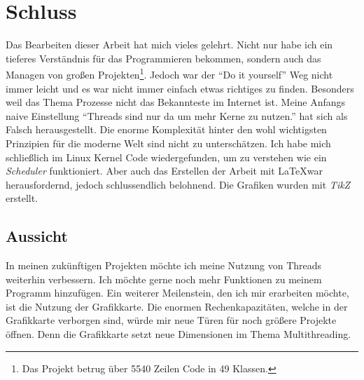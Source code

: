 \section{Schluss}
Das Bearbeiten dieser Arbeit hat mich vieles gelehrt. Nicht nur habe ich ein tieferes Verständnis für das Programmieren bekommen, sondern auch das Managen von großen Projekten\footnote{Das Projekt betrug über 5540 Zeilen Code in 49 Klassen.}. Jedoch war der ``Do it yourself'' Weg nicht immer leicht und es war nicht immer einfach etwas richtiges zu finden. Besonders weil das Thema Prozesse nicht das Bekannteste im Internet ist. Meine Anfangs naive Einstellung ``Threads sind nur da um mehr Kerne zu nutzen.'' hat sich als Falsch herausgestellt. Die enorme Komplexität hinter den wohl wichtigsten Prinzipien für die moderne Welt sind nicht zu unterschätzen. Ich habe mich schließlich im Linux Kernel Code wiedergefunden, um zu verstehen wie ein \textit{Scheduler} funktioniert. Aber auch das Erstellen der Arbeit mit \LaTeX war herausfordernd, jedoch schlussendlich belohnend. Die Grafiken wurden mit \textit{TikZ} erstellt.

\subsection{Aussicht}
In meinen zukünftigen Projekten möchte ich meine Nutzung von Threads weiterhin verbessern. Ich möchte gerne noch mehr Funktionen zu meinem Programm hinzufügen. Ein weiterer Meilenstein, den ich mir erarbeiten möchte, ist die Nutzung der Grafikkarte. Die enormen Rechenkapazitäten, welche in der Grafikkarte verborgen sind, würde mir neue Türen für noch größere Projekte öffnen. Denn die Grafikkarte setzt neue Dimensionen im Thema Multithreading.